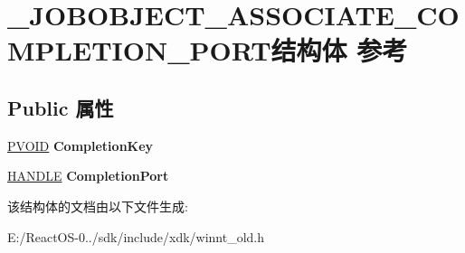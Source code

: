 \hypertarget{struct___j_o_b_o_b_j_e_c_t___a_s_s_o_c_i_a_t_e___c_o_m_p_l_e_t_i_o_n___p_o_r_t}{}\section{\+\_\+\+J\+O\+B\+O\+B\+J\+E\+C\+T\+\_\+\+A\+S\+S\+O\+C\+I\+A\+T\+E\+\_\+\+C\+O\+M\+P\+L\+E\+T\+I\+O\+N\+\_\+\+P\+O\+R\+T结构体 参考}
\label{struct___j_o_b_o_b_j_e_c_t___a_s_s_o_c_i_a_t_e___c_o_m_p_l_e_t_i_o_n___p_o_r_t}
\subsection*{Public 属性}
\begin{DoxyCompactItemize}
\item 
\mbox{\label{struct___j_o_b_o_b_j_e_c_t___a_s_s_o_c_i_a_t_e___c_o_m_p_l_e_t_i_o_n___p_o_r_t_a5f5ba3a8edd12f81426a6d5ac013a82e}} 
\hyperlink{interfacevoid}{P\+V\+O\+ID} {\bfseries Completion\+Key}
\item 
\mbox{\label{struct___j_o_b_o_b_j_e_c_t___a_s_s_o_c_i_a_t_e___c_o_m_p_l_e_t_i_o_n___p_o_r_t_aa2644e1388628d0d217dc2e96cf75c9d}} 
\hyperlink{interfacevoid}{H\+A\+N\+D\+LE} {\bfseries Completion\+Port}
\end{DoxyCompactItemize}


该结构体的文档由以下文件生成\+:\begin{DoxyCompactItemize}
\item 
E\+:/\+React\+O\+S-\/0../sdk/include/xdk/winnt\+\_\+old.\+h\end{DoxyCompactItemize}

